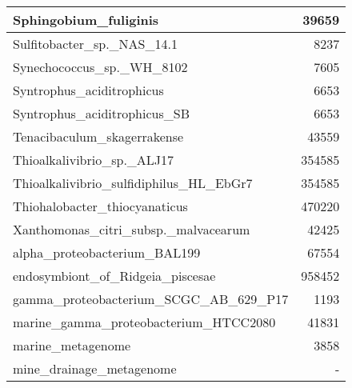 \documentclass[12pt,a4paper]{article}
\begin{document}
\begin{table}[ht]
\begin{center}
\begin{tabular}{|l*{1}{|r}|}
Sphingobium\_fuliginis & 39659 \\ \hline
Sulfitobacter\_sp.\_NAS\_14.1 & 8237 \\ \hline
Synechococcus\_sp.\_WH\_8102 & 7605 \\ \hline
Syntrophus\_aciditrophicus & 6653 \\ \hline
Syntrophus\_aciditrophicus\_SB & 6653 \\ \hline
Tenacibaculum\_skagerrakense & 43559 \\ \hline
Thioalkalivibrio\_sp.\_ALJ17 & 354585 \\ \hline
Thioalkalivibrio\_sulfidiphilus\_HL\_EbGr7 & 354585 \\ \hline
Thiohalobacter\_thiocyanaticus & 470220 \\ \hline
Xanthomonas\_citri\_subsp.\_malvacearum & 42425 \\ \hline
alpha\_proteobacterium\_BAL199 & 67554 \\ \hline
endosymbiont\_of\_Ridgeia\_piscesae & 958452 \\ \hline
gamma\_proteobacterium\_SCGC\_AB\_629\_P17 & 1193 \\ \hline
marine\_gamma\_proteobacterium\_HTCC2080 & 41831 \\ \hline
marine\_metagenome & 3858 \\ \hline
mine\_drainage\_metagenome & - \\ \hline
\end{tabular}
\end{center}
\end{table}
\end{document}
